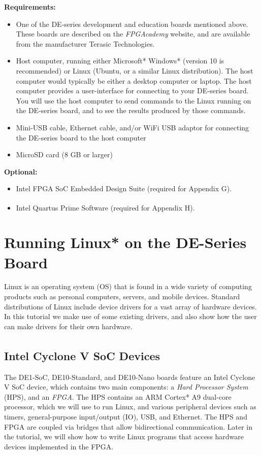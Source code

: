 \documentclass[11pt, twoside, pdftex]{article}
\begin{document}
{\bf Requirements:}
\begin{itemize}
\item One of the DE-series development and education boards mentioned above. These boards are 
described on the {\it FPGAcademy} website, and are available from the manufacturer 
Terasic Technologies.

\item Host computer, running either Microsoft* Windows* (version 10 is recommended) or Linux 
(Ubuntu, or a similar Linux distribution). The host computer would typically be either a
desktop computer or laptop. The host computer provides a user-interface for connecting to
your DE-series board. You will use the host computer to send commands to the Linux
running on the DE-series board, and to see the results produced by those commands.

\item Mini-USB cable, Ethernet cable, and/or WiFi USB adaptor for connecting the DE-series board
to the host computer 

\item MicroSD card (8 GB or larger)
\end{itemize}

{\bf Optional:}
\begin{itemize}
\item Intel FPGA SoC Embedded Design Suite (required for Appendix G).
\item Intel Quartus\textsuperscript{\textregistered} Prime Software (required for Appendix H).
\end{itemize}

\section{Running Linux* on the DE-Series Board}

Linux is an operating system (OS) that is found in a wide variety of computing products such 
as personal computers, servers, and mobile devices. Standard distributions of Linux 
include device drivers for a vast array of hardware devices. In this tutorial we make use of 
some existing drivers, and also show how the user can make drivers for their own hardware. 

\subsection{Intel Cyclone\textsuperscript{\textregistered} V SoC Devices}

The DE1-SoC, DE10-Standard, and DE10-Nano boards feature an Intel Cyclone V 
SoC device, which contains two main components: 
a {\it Hard Processor System} (HPS), and an {\it FPGA}. 
The HPS contains an ARM Cortex* A9 dual-core processor, which we will use to run Linux, and 
various peripheral devices such as timers, 
general-purpose input/output (IO), USB, and Ethernet. The HPS and FPGA are coupled via 
bridges that allow bidirectional communication. Later in the tutorial, we will show how 
to write Linux programs that access hardware devices implemented in the FPGA.
\end{document}
